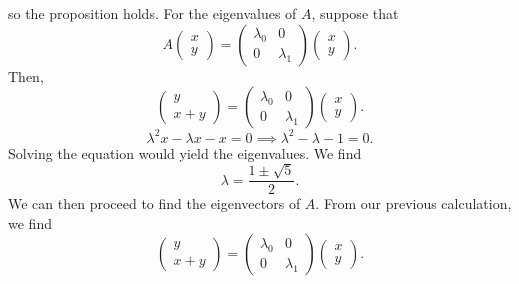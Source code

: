 \documentclass[5pt, a4paper]{article}
\begin{document}
so the proposition holds. For the eigenvalues of $A$, suppose that  \[
    A \begin{pmatrix} x \\ y \end{pmatrix} = 
    \begin{pmatrix} \lambda_0 & 0 \\ 0 & \lambda_1\end{pmatrix} 
    \begin{pmatrix} x \\ y \end{pmatrix} 
.\] Then,
\[
\begin{pmatrix} 
    y \\ x + y
\end{pmatrix} 
=
\begin{pmatrix} \lambda_0 & 0 \\ 0 & \lambda_1\end{pmatrix} 
\begin{pmatrix} x \\ y \end{pmatrix} 
.\] 
\[
\lambda^2 x - \lambda x - x = 0 \implies \lambda^2 - \lambda - 1 = 0
.\] 
Solving the equation would yield the eigenvalues. We find \[
\lambda = \frac{1 \pm \sqrt{5} }{2}
.\] 
We can then proceed to find the eigenvectors of $A$. From our previous
calculation, we find 
\[
\begin{pmatrix} 
    y \\ x + y
\end{pmatrix} 
=
\begin{pmatrix} \lambda_0 & 0 \\ 0 & \lambda_1\end{pmatrix} 
\begin{pmatrix} x \\ y \end{pmatrix} 
.\] 
\end{document}
